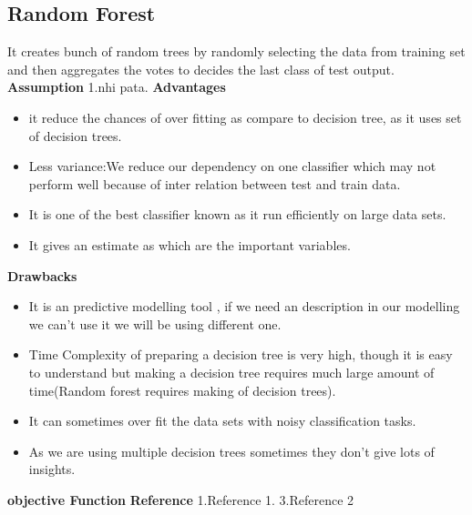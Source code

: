 \documentclass{article}
\begin{document}
\subsection{Random Forest}
It creates bunch of random trees by randomly selecting the data from training set and then aggregates the votes to decides the last class of test output.\newline
\textbf{Assumption}\newline
1.nhi pata.\newline
\textbf{Advantages}\newline
\begin{itemize}
\item it reduce the chances of over fitting as compare to decision tree, as it uses set of decision trees.
\item Less variance:We reduce our dependency on one classifier which may not perform well because of inter relation between test and train data.
\item It is one of the best classifier known as it run efficiently on large data sets.
\item It gives an estimate as which are the important variables.\newline
\end{itemize}
\textbf{Drawbacks}\newline
\begin{itemize}
\item It is an predictive modelling tool , if we need an description in our modelling we can't use it we will be using different one.
\item Time Complexity of preparing a decision tree is very high, though it is easy to understand but making a decision tree requires much large amount of time(Random forest requires making of decision trees).
\item It can sometimes over fit the data sets with noisy classification tasks.
\item As we are using multiple decision trees sometimes they don't give lots of insights.
\end{itemize}
\textbf{objective Function}\newline
\textbf{Reference}\newline
1.Reference 1.\newline
3.Reference 2 \newline
\end{document}
